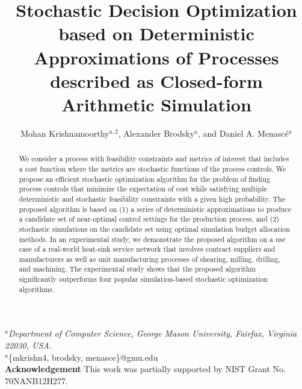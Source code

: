 \documentclass[a4paper, 12pt]{article} %
\title{\textbf{Stochastic Decision Optimization based on Deterministic Approximations of Processes described as Closed-form Arithmetic Simulation }} %
\author{Mohan Krishnamoorthy$^{a,2}$, Alexander Brodsky$^a$, and Daniel A. Menasc\'e$^{a}$} %
\makeatletter
\newcommand\mycomment[1]{\textcolor{red}{\textbf{\textit{(#1)}}}}
\renewcommand{\maketitle}{ %
\begin{flushleft} 
{\large\@title\footnotemark[1]} %

\vspace{20pt} %

{\large\@author} %
\end{flushleft}
}
\makeatother
\begin{document}
\pagestyle{empty}
\maketitle %

\begin{flushleft} 
\vspace{10pt}
$^a$\textit{Department of Computer Science, George Mason University, Fairfax, Virginia 22030, USA.
}\\
\vspace{20pt}
$^a$\{mkrishn4, brodsky, menasce\}@gmu.edu \\
\vspace{20pt}
\textbf{Acknowledgement}\newline
This work was partially supported by NIST Grant No. 70NANB12H277. \newline
\vspace{20pt}
\footnotetext[1]{Word Count: 6319 \mycomment{to update}}
\end{flushleft} 

\newpage
\pagestyle{plain}
\setcounter{page}{1}
\noindent{\large \@title }
\vspace{10pt}


\begin{abstract}{\small\noindent
We consider a process with feasibility constraints and metrics of interest that includes a cost function where the metrics are stochastic functions of the process controls. We propose an efficient stochastic optimization algorithm for the problem of finding process controls that minimize the expectation of cost while satisfying multiple deterministic and stochastic feasibility constraints with a given high probability. The proposed algorithm is based on (1) a series of deterministic approximations to produce a candidate set of near-optimal control settings for the production process, and (2) stochastic simulations on the candidate set using optimal simulation budget allocation methods. In an experimental study, we demonstrate the proposed algorithm on a use case of a real-world heat-sink service network that involves contract suppliers and manufacturers as well as unit manufacturing processes of shearing, milling, drilling, and machining. The experimental study shows that the proposed algorithm significantly outperforms four popular simulation-based stochastic optimization algorithms.
}
\end{abstract}
\end{document}
